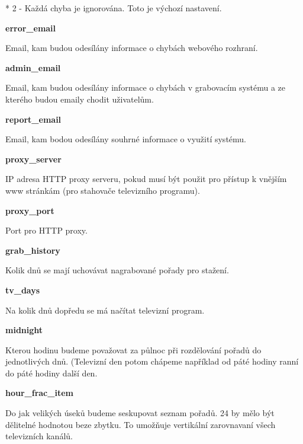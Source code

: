 * 2 - Každá chyba je ignorována. Toto je výchozí nastavení.

\vspace{10pt}

\textbf{error\_email}

Email, kam budou odesílány informace o chybách webového rozhraní.

\vspace{10pt}

\textbf{admin\_email}

Email, kam budou odesílány informace o chybách v grabovacím systému a ze kterého budou emaily chodit uživatelům.

\vspace{10pt}

\textbf{report\_email}

Email, kam bodou odesílány souhrné informace o využití systému.

\vspace{10pt}

\textbf{proxy\_server}

IP adresa HTTP proxy serveru, pokud musí být použit pro přístup k vnějším www stránkám (pro stahovače televizního programu).

\vspace{10pt}

\textbf{proxy\_port}

Port pro HTTP proxy.

\vspace{10pt}

\textbf{grab\_history}

Kolik dnů se mají uchovávat nagrabované pořady pro stažení.

\vspace{10pt}

\textbf{tv\_days}

Na kolik dnů dopředu se má načítat televizní program.

\vspace{10pt}

\textbf{midnight}

Kterou hodinu budeme považovat za půlnoc při rozdělování pořadů do jednotlivých dnů. (Televizní den potom chápeme například od páté hodiny ranní do páté hodiny další den.

\vspace{10pt}

\textbf{hour\_frac\_item}

Do jak velikých úseků budeme seskupovat seznam pořadů. 24 by mělo být dělitelné hodnotou beze zbytku. To umožňuje vertikální zarovnavaní všech televizních kanálů.


